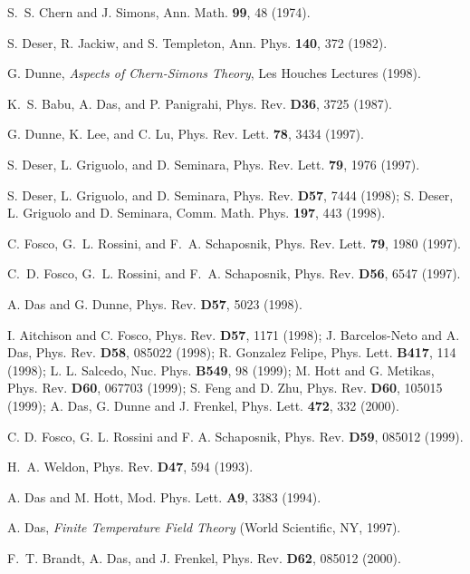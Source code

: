 \documentclass[a4paper,12pt]{article}
\begin{document}
\begin{thebibliography}{10}

S.~S. Chern and J. Simons, Ann. Math. {\bf 99},  48  (1974).

S. Deser, R. Jackiw, and S. Templeton, Ann. Phys. {\bf 140},  372  (1982).

G. Dunne, {\em Aspects of Chern-Simons Theory}, Les Houches Lectures
(1998).

K.~S. Babu, A. Das, and P. Panigrahi, Phys. Rev. {\bf D36},  3725  (1987).

G. Dunne, K. Lee, and C. Lu, Phys. Rev. Lett. {\bf 78},  3434  (1997).

S. Deser, L. Griguolo, and D. Seminara, Phys. Rev. Lett. {\bf 79},  1976
  (1997).

S. Deser, L. Griguolo, and D. Seminara, Phys. Rev. {\bf D57},  7444
(1998); S. Deser, L. Griguolo and D. Seminara,  Comm. Math. Phys.
{\bf 197}, 443 (1998).

C. Fosco, G.~L. Rossini, and F.~A. Schaposnik, Phys. Rev. Lett. {\bf 79},  1980
   (1997).

C.~D. Fosco, G.~L. Rossini, and F.~A. Schaposnik, Phys. Rev. {\bf D56},  6547
  (1997).

A. Das and G. Dunne, Phys. Rev. {\bf D57},  5023  (1998).

I. Aitchison and C. Fosco, Phys. Rev. {\bf D57}, 1171 (1998); 
J. Barcelos-Neto and A. Das, Phys. Rev. {\bf D58}, 085022 (1998);
R. Gonzalez Felipe,  Phys. Lett. {\bf B417}, 114 (1998);
L. L. Salcedo, Nuc. Phys. {\bf B549}, 98 (1999);
M. Hott and G. Metikas, Phys. Rev. {\bf D60}, 067703 (1999);
S. Feng and D. Zhu,  Phys. Rev. {\bf D60}, 105015 (1999);
A. Das, G. Dunne and J. Frenkel, Phys. Lett. {\bf 472}, 332 (2000).

 C. D. Fosco, G. L. Rossini and F. A. Schaposnik,
Phys. Rev. {\bf D59}, 085012 (1999).


H.~A. Weldon, Phys. Rev. {\bf D47},  594  (1993).

A. Das and M. Hott, Mod. Phys. Lett. {\bf A9}, 3383 (1994).

A. Das, {\em Finite Temperature Field Theory} (World Scientific, NY, 1997).

F.~T. Brandt, A. Das, and J. Frenkel, Phys. Rev. {\bf D62},  085012  (2000).


\end{thebibliography}
\end{document}
